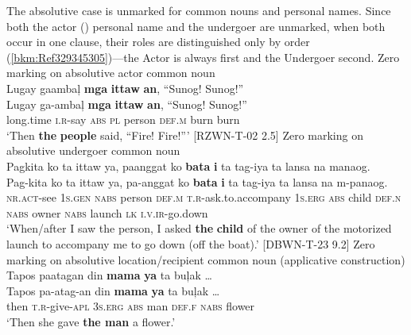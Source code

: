 The absolutive case is unmarked for common nouns and personal names. Since both the actor () personal name and the  undergoer are unmarked, when both occur in one clause, their roles are distinguished only by order (\ref{bkm:Ref329345305})---the Actor is always first and the Undergoer second.
\ea
Zero marking on absolutive actor common noun \\
Lugay  gaambaļ \textbf{mga}  \textbf{ittaw}  \textbf{an},  “Sunog!  Sunog!” \\\smallskip
 \gll Lugay  ga-ambaļ  \emptyset{} \textbf{mga}  \textbf{ittaw}  \textbf{an},  “Sunog!  Sunog!” \\
long.time  \textsc{i.r}-say  \textsc{abs} \textsc{pl}  person  \textsc{def.m}  burn  burn \\
\glt ‘Then \textbf{the} \textbf{people} said, “Fire! Fire!”' [RZWN-T-02 2.5]
\z
\ea
Zero marking on absolutive undergoer common noun \\
Pagkita  ko  ta  ittaw  ya,  paanggat  ko  \textbf{bata}  \textbf{i}  ta  tag-iya  ta  lansa  na manaog. \\\smallskip
 \gll Pag-kita  ko  ta  ittaw  ya,  pa-anggat  ko  \emptyset{} \textbf{bata}  \textbf{i}  ta  tag-iya  ta  lansa  na m-panaog. \\
\textsc{nr.act}-see  \textsc{1}\textsc{s.gen}  \textsc{nabs}  person  \textsc{def.m}  \textsc{t.r}-ask.to.accompany  1\textsc{s.erg} \textsc{abs} child  \textsc{def.n}  \textsc{nabs}  owner  \textsc{nabs}  launch  \textsc{lk}  \textsc{i.v.ir}-go.down \\
\glt `When/after I saw the person, I asked \textbf{the} \textbf{child} of the owner of the motorized launch to accompany me to go down (off the boat).’ [DBWN-T-23 9.2]
\z
\ea
Zero marking on absolutive location/recipient common noun (applicative construction) \\
Tapos  paatagan  din \textbf{mama}  \textbf{ya}  ta  buļak … \\\smallskip
 \gll Tapos  pa-atag-an  din \emptyset{} \textbf{mama}  \textbf{ya}  ta  buļak … \\
then \textsc{t.r}-give-\textsc{apl}  3\textsc{s.erg} \textsc{abs} man  \textsc{def.f}  \textsc{nabs}  flower \\
\glt `Then she gave \textbf{the man} a flower.'
\z

